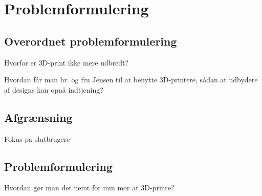 \chapter{Problemformulering} %
\label{cha:problemformulering}

\section{Overordnet problemformulering} %

Hvorfor er 3D-print ikke mere udbredt?

Hvordan får man hr. og fru Jensen til at benytte 3D-printere, sådan at udbydere af designs kan opnå indtjening?

\section{Afgrænsning} %

Fokus på slutbrugere

\section{Problemformulering} %

Hvordan gør man det nemt for min mor at 3D-printe?

